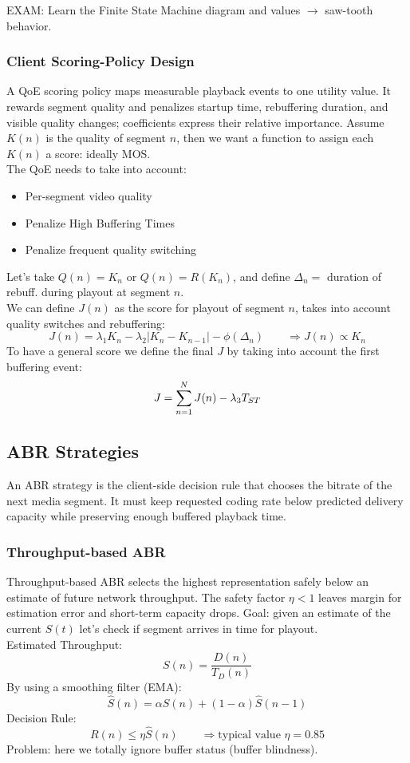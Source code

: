 EXAM: Learn the Finite State Machine diagram and values $\to$ saw-tooth behavior.
\subsubsection{Client Scoring-Policy Design}
A QoE scoring policy maps measurable playback events to one utility value. It rewards segment quality and penalizes startup time, rebuffering duration, and visible quality changes; coefficients express their relative importance.
Assume $K(n)$ is the quality of segment $n$, then we want a function to assign each $K(n)$ a score: ideally MOS.\\
The QoE needs to take into account:
\begin{itemize}
    \item Per-segment video quality
    \item Penalize High Buffering Times
    \item Penalize frequent quality switching
\end{itemize}
Let's take $Q(n) = K_n$ or $Q(n) = R(K_n)$, and define $\Delta_n =$ duration of rebuff. during playout at segment $n$.\\
We can define $J(n)$ as the score for playout of segment $n$, takes into account quality switches and rebuffering:
$$J(n) = \lambda_1 K_n - \lambda_2 \left|K_n - K_{n-1}\right| - \phi(\Delta_n) \qquad \Rightarrow J(n) \propto K_n$$
To have a general score we define the final $J$ by taking into account the first buffering event:
$$J = \sr{N}{n=1}J(n) - \lambda_3 T_{ST}$$
\subsection{ABR Strategies}
An ABR strategy is the client-side decision rule that chooses the bitrate of the next media segment. It must keep requested coding rate below predicted delivery capacity while preserving enough buffered playback time.
\subsubsection{Throughput-based ABR}
Throughput-based ABR selects the highest representation safely below an estimate of future network throughput. The safety factor $\eta<1$ leaves margin for estimation error and short-term capacity drops.
Goal: given an estimate of the current $S(t)$ let's check if segment arrives in time for playout.\\
Estimated Throughput: $$S(n) = \frac{D(n)}{T_D(n)}$$
By using a smoothing filter (EMA):
$$\hat{S}(n) = \alpha S(n) + (1- \alpha)\hat{S}(n-1)$$
Decision Rule:
$$R(n) \leq \eta \hat{S}(n) \qquad \Longrightarrow \text{typical value }\eta = 0.85$$
Problem: here we totally ignore buffer status (buffer blindness).
